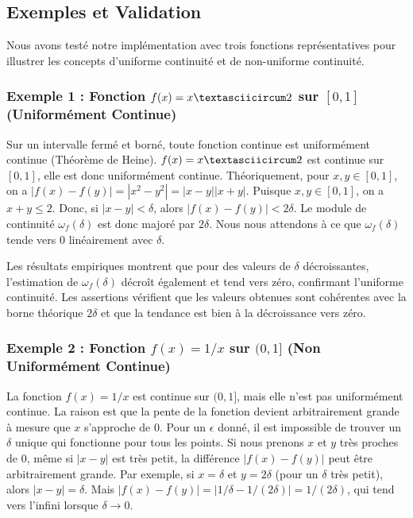 \documentclass[12pt,a4paper]{report}
\begin{document}
\subsection{Exemples et Validation}

Nous avons testé notre implémentation avec trois fonctions représentatives pour illustrer les concepts d'uniforme continuité et de non-uniforme continuité.

\subsubsection{Exemple 1 : Fonction $f(x) = x\textasciicircum 2$ sur $[0, 1]$ (Uniformément Continue)}

Sur un intervalle fermé et borné, toute fonction continue est uniformément continue (Théorème de Heine). $f(x) = x\textasciicircum 2$ est continue sur $[0, 1]$, elle est donc uniformément continue.
Théoriquement, pour $x, y \in [0, 1]$, on a $|f(x) - f(y)| = |x^2 - y^2| = |x - y||x + y|$. Puisque $x, y \in [0, 1]$, on a $x+y \le 2$. Donc, si $|x - y| < \delta$, alors $|f(x) - f(y)| < 2\delta$. Le module de continuité $\omega_f(\delta)$ est donc majoré par $2\delta$. Nous nous attendons à ce que $\omega_f(\delta)$ tende vers 0 linéairement avec $\delta$.

Les résultats empiriques montrent que pour des valeurs de $\delta$ décroissantes, l'estimation de $\omega_f(\delta)$ décroît également et tend vers zéro, confirmant l'uniforme continuité. Les assertions vérifient que les valeurs obtenues sont cohérentes avec la borne théorique $2\delta$ et que la tendance est bien à la décroissance vers zéro.

\subsubsection{Exemple 2 : Fonction $f(x) = 1/x$ sur $(0, 1]$ (Non Uniformément Continue)}

La fonction $f(x) = 1/x$ est continue sur $(0, 1]$, mais elle n'est pas uniformément continue. La raison est que la pente de la fonction devient arbitrairement grande à mesure que $x$ s'approche de 0. Pour un $\epsilon$ donné, il est impossible de trouver un $\delta$ unique qui fonctionne pour tous les points. Si nous prenons $x$ et $y$ très proches de 0, même si $|x - y|$ est très petit, la différence $|f(x) - f(y)|$ peut être arbitrairement grande.
Par exemple, si $x = \delta$ et $y = 2\delta$ (pour un $\delta$ très petit), alors $|x - y| = \delta$. Mais $|f(x) - f(y)| = |1/\delta - 1/(2\delta)| = 1/(2\delta)$, qui tend vers l'infini lorsque $\delta \to 0$.
\end{document}
